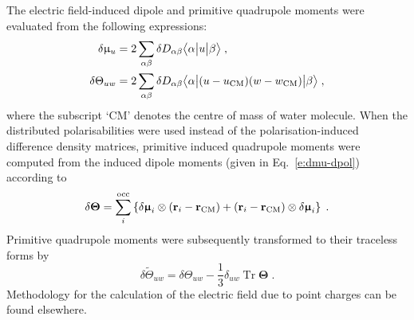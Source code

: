 \documentclass[aip,amsmath,amssymb,reprint,floatfix]{revtex4-1}
\newcommand{\tbraket}[3]{\ensuremath{\bigl\langle {#1} \bigl\lvert {#2} \bigl\lvert {#3} \bigr\rangle}}
\newcommand{\BM}[1]{\bm{#1}}
\DeclareMathOperator{\Tr}{Tr}
\begin{document}
The electric field\hyp{}induced dipole and primitive quadrupole moments were evaluated from the following expressions:
%
\begin{subequations}\label{e:dmult}
  \begin{align}
   \delta \upmu_{u}   &= 2\sum_{\alpha\beta} \delta D_{\alpha\beta} \tbraket{\alpha}{u}{\beta}  \;,\\
   \delta \Theta_{uw} &= 2\sum_{\alpha\beta} \delta D_{\alpha\beta} \tbraket{\alpha}{(u-u_{\rm CM})(w-w_{\rm CM})}{\beta} \;, 
  \end{align}
\end{subequations}
%
where the subscript `CM' denotes the centre of mass of water molecule.
When the distributed polarisabilities were used instead of the polarisation\hyp{}induced 
difference density matrices, primitive induced quadrupole moments were computed from
the induced dipole moments (given in Eq.~\eqref{e:dmu-dpol}) according to
%
\begin{equation}
  \delta {\BM \Theta} = \sum_i^{\rm occ} 
   \left\{ 
       \delta {\BM \upmu}_i \otimes \left( {\bf r}_i - {\bf r}_{\rm CM} \right) 
      + \left( {\bf r}_i - {\bf r}_{\rm CM} \right) \otimes \delta {\BM \upmu}_i
   \right\} \;.
\end{equation}
%
Primitive quadrupole moments were subsequently transformed to their traceless forms by
%
\begin{equation}
  \delta \widetilde{\Theta}_{uw} = \delta \Theta_{uw} - \frac{1}{3} \delta_{uw} \Tr{\BM\Theta} \;.
\end{equation}
%
Methodology for the calculation of the electric field due to point charges
can be found elsewhere.\cite{Blasiak.Cho.JCP.2014}
\end{document}
